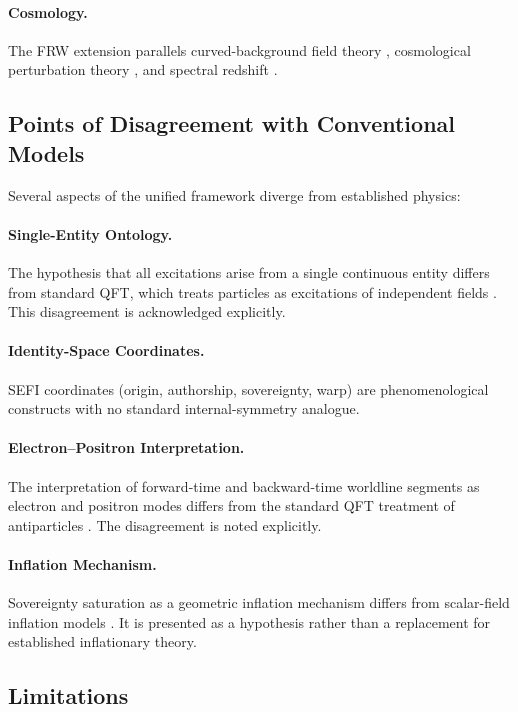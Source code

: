 \documentclass[aip,jmp,reprint,onecolumn,nofootinbib]{revtex4-2}
\begin{document}
\paragraph{Cosmology.}
The FRW extension parallels curved-background field theory \cite{WaldGR}, cosmological 
perturbation theory \cite{MukhanovBook,Dodelson}, and spectral redshift \cite{Peebles}.

\subsection{Points of Disagreement with Conventional Models}

Several aspects of the unified framework diverge from established physics:

\paragraph{Single-Entity Ontology.}
The hypothesis that all excitations arise from a single continuous entity differs from 
standard QFT, which treats particles as excitations of independent fields 
\cite{WeinbergQFT1,PeskinSchroeder}. This disagreement is acknowledged explicitly.

\paragraph{Identity-Space Coordinates.}
SEFI coordinates (origin, authorship, sovereignty, warp) are phenomenological constructs 
with no standard internal-symmetry analogue.

\paragraph{Electron–Positron Interpretation.}
The interpretation of forward-time and backward-time worldline segments as electron and 
positron modes differs from the standard QFT treatment of antiparticles 
\cite{WeinbergQFT1}. The disagreement is noted explicitly.

\paragraph{Inflation Mechanism.}
Sovereignty saturation as a geometric inflation mechanism differs from scalar-field 
inflation models \cite{GuthInflation,LindeInflation}. It is presented as a hypothesis rather 
than a replacement for established inflationary theory.

\subsection{Limitations}
\end{document}

